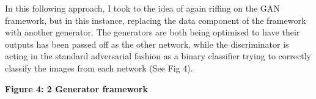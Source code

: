   \begin{figure}[!htbp]
    \centering
    \hfill
    \hfill
    \caption[]{}
    \label{fig:c3:cosine-euclid-losses}
  \end{figure}

In this following approach, I took to the idea of again riffing on the GAN framework, but in this instance, replacing the data component of the framework with another generator. 
The generators are both being optimised to have their outputs has been passed off as the other network, while the discriminator is acting in the standard adversarial fashion as a binary classifier trying to correctly classify the images from each network (See Fig 4). 

\textbf{Figure 4: 2 Generator framework}

